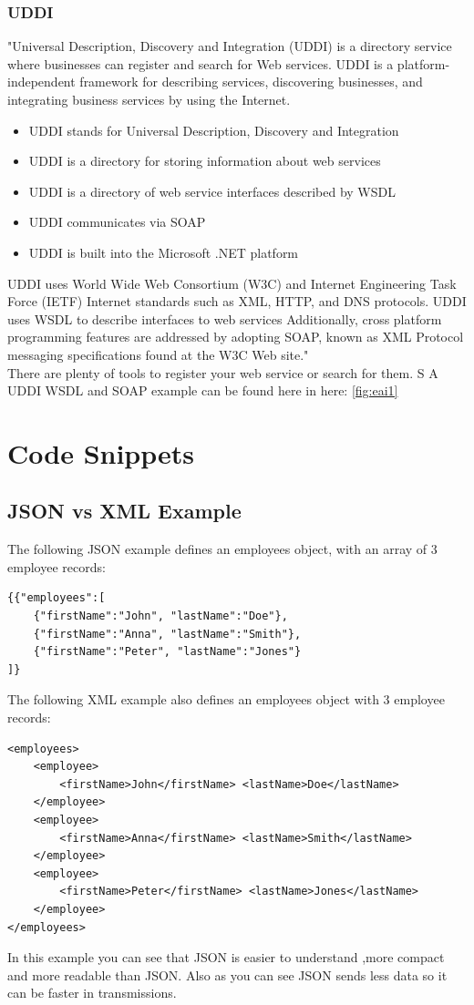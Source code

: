 \documentclass[12pt]{article}
\begin{document}
\subsubsection{UDDI}
"Universal Description, Discovery and Integration (UDDI) is a directory service where businesses can register and search for Web services.
UDDI is a platform-independent framework for describing services, discovering businesses, and integrating business services by using the Internet.\\
\begin{itemize}
\item UDDI stands for Universal Description, Discovery and Integration
\item UDDI is a directory for storing information about web services
\item UDDI is a directory of web service interfaces described by WSDL
\item UDDI communicates via SOAP
\item UDDI is built into the Microsoft .NET platform
\end{itemize}
UDDI uses World Wide Web Consortium (W3C) and Internet Engineering Task Force (IETF) Internet standards such as XML, HTTP, and DNS protocols.
UDDI uses WSDL to describe interfaces to web services Additionally, cross platform programming features are addressed by adopting SOAP, known as XML Protocol messaging specifications found at the W3C Web site."\cite{uddi}\\
There are plenty of tools to register your web service or search for them. S
A UDDI WSDL and SOAP example can be found here in here: \ref{fig:eai1}
\newpage
\section{Code Snippets}
\subsection{JSON vs XML Example}
\label{sec:json}
The following JSON example defines an employees object, with an array of 3 employee records:
\begin{lstlisting}
{{"employees":[
    {"firstName":"John", "lastName":"Doe"}, 
    {"firstName":"Anna", "lastName":"Smith"},
    {"firstName":"Peter", "lastName":"Jones"}
]}
\end{lstlisting}
The following XML example also defines an employees object with 3 employee records:
\begin{lstlisting}
<employees>
    <employee>
        <firstName>John</firstName> <lastName>Doe</lastName>
    </employee>
    <employee>
        <firstName>Anna</firstName> <lastName>Smith</lastName>
    </employee>
    <employee>
        <firstName>Peter</firstName> <lastName>Jones</lastName>
    </employee>
</employees>
\end{lstlisting}
In this example you can see that JSON is easier to understand ,more compact and more readable than JSON.
Also as you can see JSON sends less data so it can be faster in transmissions.\cite{jsonxml}
\end{document}
